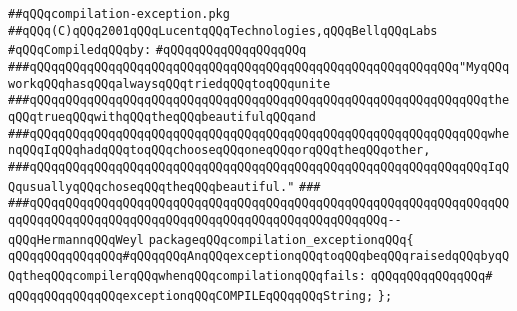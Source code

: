 \label{src/lib/compiler/front/basics/map/compilation-exception.pkg}
\verb|##qQQqcompilation-exception.pkg|\newline
\verb|##qQQq(C)qQQq2001qQQqLucentqQQqTechnologies,qQQqBellqQQqLabs|\newline
\newline
\verb|#qQQqCompiledqQQqby:|\newline
\verb|#qQQqqQQqqQQqqQQqqQQq|\newline
\newline
\newline
\newline
\verb|###qQQqqQQqqQQqqQQqqQQqqQQqqQQqqQQqqQQqqQQqqQQqqQQqqQQqqQQqqQQq"MyqQQqworkqQQqhasqQQqalwaysqQQqtriedqQQqtoqQQqunite|\newline
\verb|###qQQqqQQqqQQqqQQqqQQqqQQqqQQqqQQqqQQqqQQqqQQqqQQqqQQqqQQqqQQqqQQqtheqQQqtrueqQQqwithqQQqtheqQQqbeautifulqQQqand|\newline
\verb|###qQQqqQQqqQQqqQQqqQQqqQQqqQQqqQQqqQQqqQQqqQQqqQQqqQQqqQQqqQQqqQQqwhenqQQqIqQQqhadqQQqtoqQQqchooseqQQqoneqQQqorqQQqtheqQQqother,|\newline
\verb|###qQQqqQQqqQQqqQQqqQQqqQQqqQQqqQQqqQQqqQQqqQQqqQQqqQQqqQQqqQQqqQQqIqQQqusuallyqQQqchoseqQQqtheqQQqbeautiful."|\newline
\verb|###|\newline
\verb|###qQQqqQQqqQQqqQQqqQQqqQQqqQQqqQQqqQQqqQQqqQQqqQQqqQQqqQQqqQQqqQQqqQQqqQQqqQQqqQQqqQQqqQQqqQQqqQQqqQQqqQQqqQQqqQQqqQQqqQQq--qQQqHermannqQQqWeyl|\newline
\newline
\newline
\newline
\verb|packageqQQqcompilation_exceptionqQQq{|\newline
\newline
\verb|qQQqqQQqqQQqqQQq#qQQqqQQqAnqQQqexceptionqQQqtoqQQqbeqQQqraisedqQQqbyqQQqtheqQQqcompilerqQQqwhenqQQqcompilationqQQqfails:|\newline
\verb|qQQqqQQqqQQqqQQq#|\newline
\verb|qQQqqQQqqQQqqQQqexceptionqQQqCOMPILEqQQqqQQqString;|\newline
\verb|};|\newline

